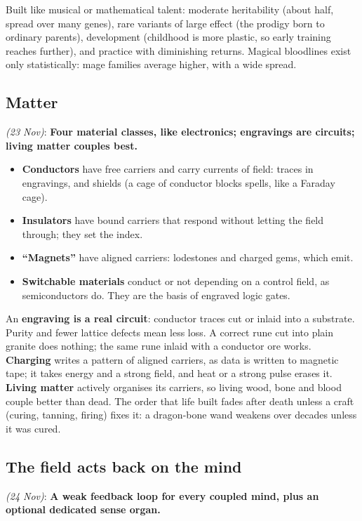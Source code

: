 \documentclass[11pt,a4paper]{article}
\newcommand{\decision}[3]{\par\smallskip\noindent{\color{dec}\textbf{Decision #1}} \textit{(#2)}: \textbf{#3}\par}
\begin{document}
Built like musical or mathematical talent: moderate heritability (about half, spread over many genes), rare variants of large effect (the prodigy born to ordinary parents), development (childhood is more plastic, so early training reaches further), and practice with diminishing returns. Magical bloodlines exist only statistically: mage families average higher, with a wide spread.

\subsection{Matter}

\decision{Q2.2}{23 Nov}{Four material classes, like electronics; engravings are circuits; living matter couples best.}

\begin{itemize}
  \item \textbf{Conductors} have free carriers and carry currents of field: traces in engravings, and shields (a cage of conductor blocks spells, like a Faraday cage).
  \item \textbf{Insulators} have bound carriers that respond without letting the field through; they set the index.
  \item \textbf{``Magnets''} have aligned carriers: lodestones and charged gems, which emit.
  \item \textbf{Switchable materials} conduct or not depending on a control field, as semiconductors do. They are the basis of engraved logic gates.
\end{itemize}
An \textbf{engraving is a real circuit}: conductor traces cut or inlaid into a substrate. Purity and fewer lattice defects mean less loss. A correct rune cut into plain granite does nothing; the same rune inlaid with a conductor ore works. \textbf{Charging} writes a pattern of aligned carriers, as data is written to magnetic tape; it takes energy and a strong field, and heat or a strong pulse erases it. \textbf{Living matter} actively organises its carriers, so living wood, bone and blood couple better than dead. The order that life built fades after death unless a craft (curing, tanning, firing) fixes it: a dragon-bone wand weakens over decades unless it was cured.

\subsection{The field acts back on the mind}

\decision{Q2.4}{24 Nov}{A weak feedback loop for every coupled mind, plus an optional dedicated sense organ.}
\end{document}
